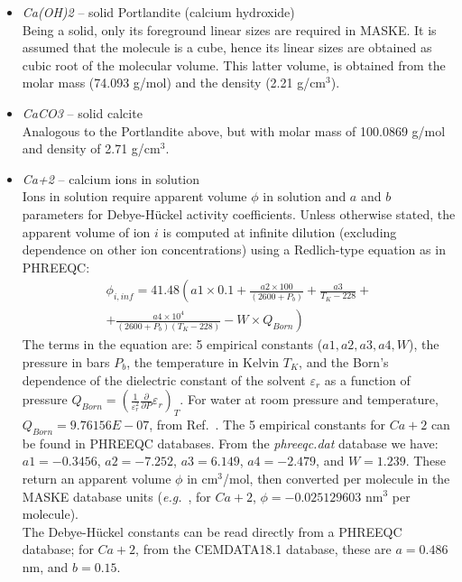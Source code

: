 \documentclass[12pt]{paper}    %
\newcommand{\eg}{\textit{e.g.}~}
\newcommand{\refrname}{Ref.~}
\begin{document}
\begin{itemize}
\item \textit{Ca(OH)2} -- solid Portlandite (calcium hydroxide) \\ 
Being a solid, only its foreground linear sizes are required in MASKE. It is assumed that the molecule is a cube, hence its linear sizes are obtained as cubic root of the molecular volume. This latter volume, is obtained from the molar mass (74.093 g/mol) and the density (2.21 g/cm$^3$).
%
\item \textit{CaCO3} -- solid calcite \\ 
Analogous to the Portlandite above, but with molar mass of 100.0869 g/mol and  density of 2.71 g/cm$^3$.
%
\item \textit{Ca+2} -- calcium ions in solution \\ 
Ions in solution require apparent volume $\phi$ in solution and $a$ and $b$ parameters for Debye-H\"uckel activity coefficients. Unless otherwise stated, the apparent volume of ion $i$ is computed at infinite dilution (excluding dependence on other ion concentrations) using a Redlich-type equation \cite{redlich1964molal} as in PHREEQC:
%
\begin{align}
\phi_{i,inf}= 41.48\left( a1 \times 0.1 + \frac{a2\times 100}{\left(2600 + P_b\right)} + \frac{a3}{T_K-228} + \right.   \nonumber \\
%
\left. + \frac{a4 \times 10^4}{\left(2600+P_b\right)\left(T_K - 228 \right) } - W\times Q_{Born} \right)
\end{align}
%
The terms in the equation are: 5 empirical constants ($a1, a2, a3, a4, W$), the pressure in bars $P_b$, the temperature in Kelvin $T_K$, and the Born's dependence of the dielectric constant of the solvent $\varepsilon_r$ as a function of pressure $Q_{Born} = \left(\frac{1}{\varepsilon_r^2}\frac{\partial }{\partial P}\varepsilon_r \right)_T$. For water at room pressure and temperature, $Q_{Born} = 9.76156E-07$, from \refrname\cite{bradley1979thermodynamics}.  The 5 empirical constants for $Ca+2$ can be found in PHREEQC databases. From the \textit{phreeqc.dat} database we have: $a1 = -0.3456$, $a2 = -7.252$, $a3 = 6.149$, $a4 = -2.479$, and $W = 1.239$. These return an apparent volume $\phi$ in cm$^3$/mol, then converted per molecule in the MASKE database units (\eg, for $Ca+2$, $\phi = -0.025129603$ nm$^3$ per molecule).
\\
The Debye-H\"uckel constants can be read directly from a PHREEQC database; for $Ca+2$, from the CEMDATA18.1 database, these are $a = 0.486$ nm, and $b = 0.15$.

\end{itemize}
\end{document}

